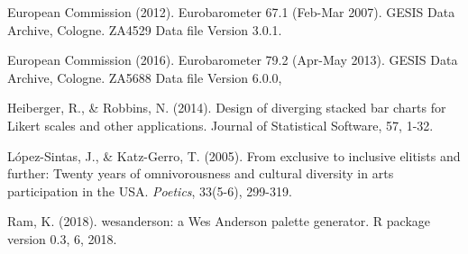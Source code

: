 \documentclass{article}
\begin{document}
European Commission (2012). Eurobarometer 67.1 (Feb-Mar 2007). GESIS Data Archive, Cologne. ZA4529 Data file Version 3.0.1. 

European Commission (2016). Eurobarometer 79.2 (Apr-May 2013). GESIS Data Archive, Cologne. ZA5688 Data file Version 6.0.0, 

Heiberger, R., \& Robbins, N. (2014). Design of diverging stacked bar charts for Likert scales and other applications. Journal of Statistical Software, 57, 1-32.

López-Sintas, J., \& Katz-Gerro, T. (2005). From exclusive to inclusive elitists and further: Twenty years of omnivorousness and cultural diversity in arts participation in the USA. \textit{Poetics}, 33(5-6), 299-319.

Ram, K. (2018). wesanderson: a Wes Anderson palette generator. R package version 0.3, 6, 2018.
\end{document}
